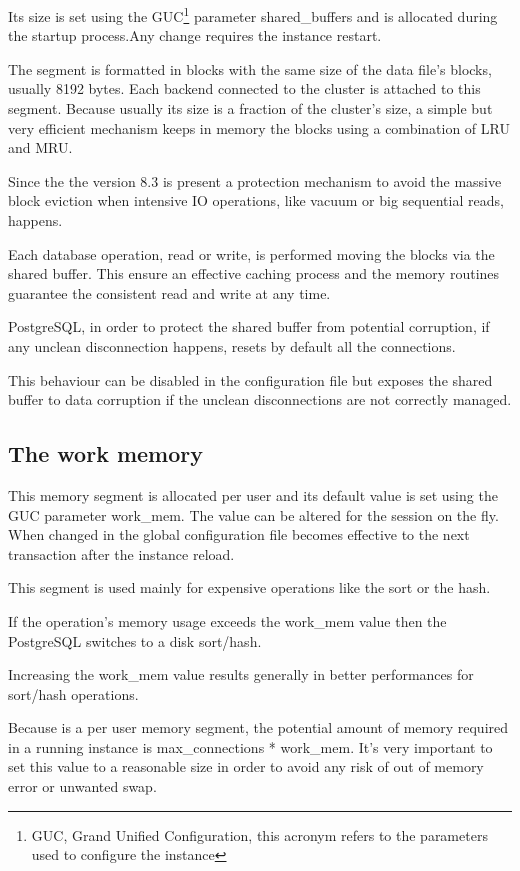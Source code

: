 Its size is set using the GUC\footnote{GUC, Grand Unified Configuration, this 
acronym refers to the parameters used to configure the instance} parameter 
shared\_buffers and is allocated 
during the startup process.Any change requires the instance restart.

The segment is formatted in blocks with the same size of the data file's 
blocks, usually 8192 bytes. Each backend connected to the cluster is attached 
to this segment. Because usually its size is a fraction of the cluster's size, 
a simple but very efficient mechanism keeps in memory the blocks using a 
combination of LRU and MRU.

Since the the version 8.3 is present a protection mechanism to avoid the 
massive block eviction when intensive IO operations, like vacuum or big 
sequential reads, happens.

Each database operation, read or write, is performed moving the blocks via the 
shared buffer. This ensure an effective caching process and the memory routines 
guarantee the consistent read and write at any time.

PostgreSQL, in order to protect the shared buffer from potential corruption, if 
any unclean disconnection happens, resets by default all the connections. 

This behaviour can be disabled in the configuration file but exposes the shared 
buffer to data corruption if the unclean disconnections are not correctly 
managed.



\subsection{The work memory}
\label{sub:WORKMEM}
This memory segment is allocated per user and its default value is set using 
the GUC parameter work\_mem. The value can be altered for the session on the 
fly. When changed in the global configuration file becomes effective to the 
next transaction after the instance reload. 

This segment is used mainly for expensive operations like the sort or the 
hash.

If the operation's memory usage exceeds the work\_mem value then the PostgreSQL 
switches to a disk sort/hash. 

Increasing the work\_mem value results generally in better performances for 
sort/hash operations. 

Because is a per user memory segment, the potential amount of memory 
required in a running instance is max\_connections * work\_mem. It's very 
important to set this value to a reasonable size in order to avoid any risk of 
out of memory error or unwanted swap.

